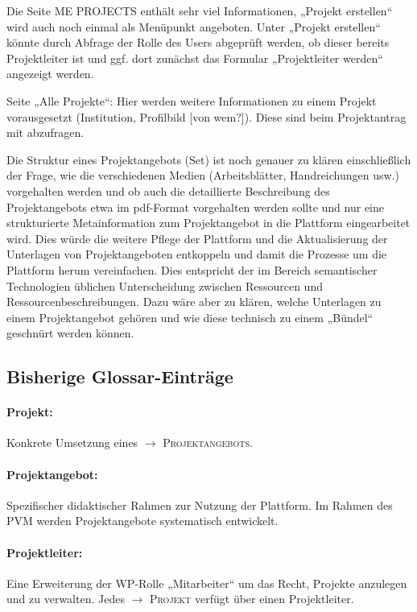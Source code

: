 \documentclass[a4paper,11pt]{article}
\newcommand{\glossar}[1]{{$\to$ \textsc{#1}}}
\begin{document}
Die Seite ME PROJECTS enthält sehr viel Informationen, „Projekt erstellen“ wird
auch noch einmal als Menüpunkt angeboten. Unter „Projekt erstellen“ könnte
durch Abfrage der Rolle des Users abgeprüft werden, ob dieser bereits
Projektleiter ist und ggf. dort zunächst das Formular „Projektleiter werden“
angezeigt werden.

Seite „Alle Projekte“: Hier werden weitere Informationen zu einem Projekt
vorausgesetzt (Institution, Profilbild [von wem?]). Diese sind beim
Projektantrag mit abzufragen.

Die Struktur eines Projektangebots (Set) ist noch genauer zu klären
einschließlich der Frage, wie die verschiedenen Medien (Arbeitsblätter,
Handreichungen usw.)  vorgehalten werden und ob auch die detaillierte
Beschreibung des Projektangebots etwa im pdf-Format vorgehalten werden sollte
und nur eine strukturierte Metainformation zum Projektangebot in die Plattform
eingearbeitet wird.  Dies würde die weitere Pflege der Plattform und die
Aktualisierung der Unterlagen von Projektangeboten entkoppeln und damit die
Prozesse um die Plattform herum vereinfachen.  Dies entspricht der im Bereich
semantischer Technologien üblichen Unterscheidung zwischen Ressourcen und
Ressourcenbeschreibungen. Dazu wäre aber zu klären, welche Unterlagen zu einem
Projektangebot gehören und wie diese technisch zu einem „Bündel“ geschnürt
werden können.

\subsection{Bisherige Glossar-Einträge} 

\paragraph{Projekt:}
Konkrete Umsetzung eines \glossar{Projektangebots}.

\paragraph{Projektangebot:}
Spezifischer didaktischer Rahmen zur Nutzung der Plattform. Im Rahmen des PVM
werden Projektangebote systematisch entwickelt.

\paragraph{Projektleiter:}
Eine Erweiterung der WP-Rolle „Mitarbeiter“ um das Recht, Projekte anzulegen
und zu verwalten.  Jedes \glossar{Projekt} verfügt über einen Projektleiter.
\end{document}

